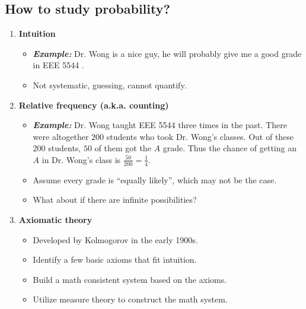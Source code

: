 \subsection{How to study probability?}
\begin{enumerate}
\item \textbf{Intuition}
\begin{itemize}
\item \emph{\bf{Example:} } Dr. Wong is a nice guy, he will probably give me a good grade in EEE 5544 .
\item Not systematic, guessing, cannot quantify.
\end{itemize}

\item \textbf{Relative frequency (a.k.a. counting)} 
\begin{itemize}
\item \emph{\bf{Example:} } Dr. Wong taught EEE 5544 three times in the
  past. There were altogether $200$ students who took Dr. Wong's
  classes. Out of these $200$ students, $50$ of them got the \(A\) grade.
  Thus the chance of getting an \(A\) in Dr. Wong's class is
  \(\frac{50}{200}=\frac{1}{4}\).
\item Assume every grade is ``equally likely'', which may not be the case.
\item What about if there are infinite possibilities?
\end{itemize}

\item \textbf{Axiomatic theory} 
\begin{itemize}
  \item Developed by Kolmogorov in the early 1900s.
  \item Identify a few basic axioms that fit intuition.
  \item Build a math consistent system based on the axioms.
  \item Utilize measure theory to construct the math system.
\end{itemize}
\end{enumerate}

